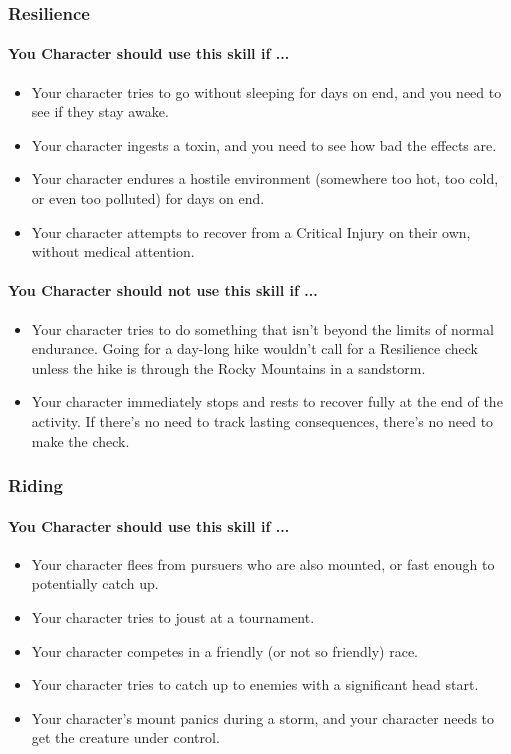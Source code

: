 \begin{multicols}{2}
\subsubsection{Resilience}\label{skill:resilience}
\paragraph{You Character should use this skill if ...}
\begin{itemize}
    \item Your character tries to go without sleeping for days on end, and you
        need to see if they stay awake.
    \item Your character ingests a toxin, and you need to see how bad the effects
        are.
    \item Your character endures a hostile environment (somewhere too hot, too
        cold, or even too polluted) for days on end.
    \item Your character attempts to recover from a Critical Injury on their own,
        without medical attention.
\end{itemize}
\paragraph{You Character should not use this skill if ...}
\begin{itemize}
    \item Your character tries to do something that isn't beyond the limits of
        normal endurance. Going for a day-long hike wouldn't call for a Resilience
        check unless the hike is through the Rocky Mountains in a sandstorm.
    \item Your character immediately stops and rests to recover fully at the end
        of the activity. If there's no need to track lasting consequences, there's
        no need to make the check.
\end{itemize}

\subsubsection{Riding}\label{skill:riding}
\paragraph{You Character should use this skill if ...}
\begin{itemize}
    \item Your character flees from pursuers who are also mounted, or fast enough
        to potentially catch up.
    \item Your character tries to joust at a tournament.
    \item Your character competes in a friendly (or not so friendly) race.
    \item Your character tries to catch up to enemies with a significant head
        start.
    \item Your character's mount panics during a storm, and your character needs
        to get the creature under control.
\end{itemize}

\end{multicols}

